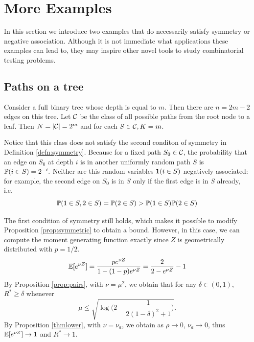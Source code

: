 \documentclass[10pt, oneside]{article}
\begin{document}
\section{More Examples}

In this section we introduce two examples that do necessarily satisfy symmetry or negative association. Although it is not immediate what applications these examples can lead to, they may inspire other novel tools to study combinatorial testing problems.

\subsection{Paths on a tree}
Consider a full binary tree whose depth is equal to $m$. Then there are $n = 2m-2$ edges on this tree. Let ${\mathcal C}$ be the class of all possible paths from the root node to a leaf. Then $N = |{\mathcal C}| = 2^m$ and for each $S \in {\mathcal C}, K = m$. 

Notice that this class does not satisfy the second conditon of symmetry in Definition \ref{defn:symmetry}. Because for a fixed path $S_0 \in {\mathcal C}$, the probability that an edge on $S_0$ at depth $i$ is in another uniformly random path $S$ is $\mathbb{P}(i \in S) = 2^{-i}.$ Neither are this random variables ${\bf 1}(i \in S)$ negatively associated: for example, the second edge on $S_0$ is in $S$ only if the first edge is in $S$ already, i.e.
$$\mathbb{P}(1 \in S, 2 \in S) = \mathbb{P}(2 \in S) >\mathbb{P}(1 \in S)\mathbb{P}(2 \in S) $$

The first condition of symmetry still holds, which makes it possible to modify Proposition \ref{prop:symmetric} to obtain a bound. However, in this case, we can compute the moment generating function exactly since $Z$ is geometrically distributed with $p = 1/2.$
$$\mathbb{E}[e^{\nu Z}] = \frac{p e^{\nu Z}}{1 - (1-p)e^{\nu Z}} = \frac{2}{2 - e^{\nu Z}} - 1$$
By Proposition \ref{prop:pairs}, with $\nu = \mu^2$, we obtain that for any $\delta\in(0,1)$, $R^* \ge\delta$ whenever
$$\mu\le\sqrt{\log\bigl(2-\frac{1}{2(1-\delta)^2 + 1}\bigr)}.$$
By Proposition \ref{thmlower}, with $\nu = \nu_a$, we obtain as $\rho \to 0$, $\nu_a \to 0$, thus $\mathbb{E}[e^{\nu Z}] \to 1$ and $R^* \to 1$.
\end{document}
